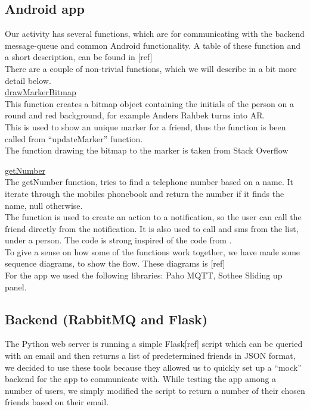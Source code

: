 \documentclass[runningheads,a4paper]{llncs}
\begin{document}
\subsection{Android app}
Our activity has several functions, which are for communicating with the backend message-queue and common Android functionality. A table of these function and a short description, can be found in [ref] \\
There are a couple of non-trivial functions, which we will describe in a bit more detail below.\\

\underline{drawMarkerBitmap}\\
This function creates a bitmap object containing the initials of the person on a round and red background, for example Anders Rahbek turns into AR.\\

This is used to show an unique marker for a friend, thus the function is been called from “updateMarker” function. \\
The function drawing the bitmap to the marker is taken from Stack Overflow\cite{bitmapstackoverflow}

\underline{getNumber}\\
The getNumber function, tries to find a telephone number based on a name. It iterate through the mobiles phonebook and return the number if it finds the name, null otherwise. \\

The function is used to create an action to a notification, so the user can call the friend directly from the notification. It is also used to call and sms from the list, under a person. 
The code is strong inspired of the code from \cite{number}.\\


To give a sense on how some of the functions work together, we have made some sequence diagrams, to show the flow. These diagrams is [ref]\\ 

For the app we used the following libraries: Paho MQTT\cite{paho}, Sothee Sliding up panel\cite{slidinguppanel}.


\subsection{Backend (RabbitMQ and Flask)}
The Python web server is running a simple Flask[ref] script which can be queried with an email and then returns a list of predetermined friends in JSON format, we decided to use these tools because they allowed us to quickly set up a “mock” backend for the app to communicate with. While testing the app among a number of users, we simply modified the script to return a number of their chosen friends based on their email.\\
\end{document}
